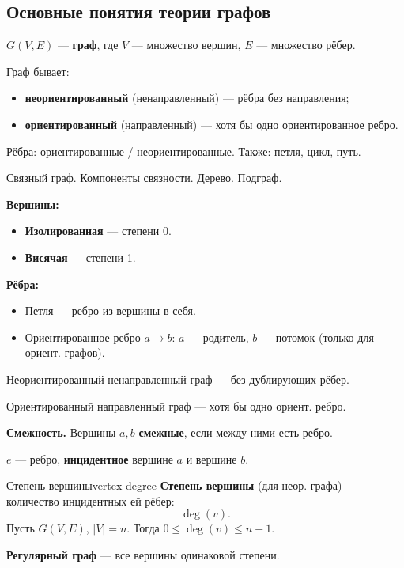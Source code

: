\bigskip
\subsection*{Основные понятия теории графов}

$G(V, E)$ --- \textbf{граф}, где $V$ --- множество вершин, $E$ --- множество рёбер.

Граф бывает:
\begin{itemize}
  \item \textbf{неориентированный} (ненаправленный) --- рёбра без направления;
  \item \textbf{ориентированный} (направленный) --- хотя бы одно ориентированное ребро.
\end{itemize}

Рёбра: ориентированные / неориентированные. Также: петля, цикл, путь.

Связный граф. Компоненты связности. Дерево. Подграф.

\bigskip
\textbf{Вершины:}
\begin{itemize}
  \item \textbf{Изолированная} --- степени 0.
  \item \textbf{Висячая} --- степени 1.
\end{itemize}

\textbf{Рёбра:}
\begin{itemize}
  \item Петля --- ребро из вершины в себя.
  \item Ориентированное ребро $a \to b$: $a$ --- родитель, $b$ --- потомок
        (только для ориент. графов).
\end{itemize}

Неориентированный ненаправленный граф --- без дублирующих рёбер.

Ориентированный направленный граф --- хотя бы одно ориент. ребро.

\textbf{Смежность.} Вершины $a, b$ \textbf{смежные}, если между ними есть ребро.

$e$ --- ребро, \textbf{инцидентное} вершине $a$ и вершине $b$.

\bigskip
\begin{defn}{Степень вершины}{vertex-degree}
\textbf{Степень вершины} (для неор. графа) --- количество инцидентных ей рёбер:
\[
  \deg(v).
\]
Пусть $G(V, E)$, $|V| = n$. Тогда $0 \leq \deg(v) \leq n - 1$.
\end{defn}

\textbf{Регулярный граф} --- все вершины одинаковой степени.


